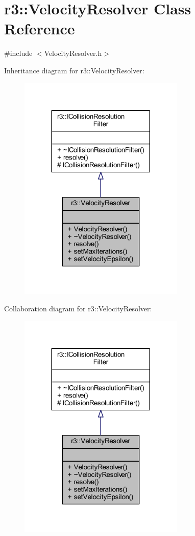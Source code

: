 \hypertarget{classr3_1_1_velocity_resolver}{}\section{r3\+:\+:Velocity\+Resolver Class Reference}
\label{classr3_1_1_velocity_resolver}


{\ttfamily \#include $<$Velocity\+Resolver.\+h$>$}



Inheritance diagram for r3\+:\+:Velocity\+Resolver\+:\nopagebreak
\begin{figure}[H]
\begin{center}
\leavevmode
\includegraphics[width=224pt]{classr3_1_1_velocity_resolver__inherit__graph}
\end{center}
\end{figure}


Collaboration diagram for r3\+:\+:Velocity\+Resolver\+:\nopagebreak
\begin{figure}[H]
\begin{center}
\leavevmode
\includegraphics[width=224pt]{classr3_1_1_velocity_resolver__coll__graph}
\end{center}
\end{figure}
